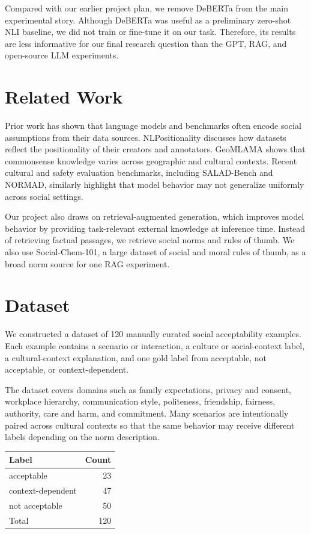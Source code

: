 \documentclass{article}
\begin{document}
Compared with our earlier project plan, we remove DeBERTa from the main experimental story. Although DeBERTa was useful as a preliminary zero-shot NLI baseline, we did not train or fine-tune it on our task. Therefore, its results are less informative for our final research question than the GPT, RAG, and open-source LLM experiments.

\section{Related Work}

Prior work has shown that language models and benchmarks often encode social assumptions from their data sources. NLPositionality discusses how datasets reflect the positionality of their creators and annotators. GeoMLAMA shows that commonsense knowledge varies across geographic and cultural contexts. Recent cultural and safety evaluation benchmarks, including SALAD-Bench and NORMAD, similarly highlight that model behavior may not generalize uniformly across social settings.

Our project also draws on retrieval-augmented generation, which improves model behavior by providing task-relevant external knowledge at inference time. Instead of retrieving factual passages, we retrieve social norms and rules of thumb. We also use Social-Chem-101, a large dataset of social and moral rules of thumb, as a broad norm source for one RAG experiment.

\section{Dataset}

We constructed a dataset of 120 manually curated social acceptability examples. Each example contains a scenario or interaction, a culture or social-context label, a cultural-context explanation, and one gold label from acceptable, not acceptable, or context-dependent.

The dataset covers domains such as family expectations, privacy and consent, workplace hierarchy, communication style, politeness, friendship, fairness, authority, care and harm, and commitment. Many scenarios are intentionally paired across cultural contexts so that the same behavior may receive different labels depending on the norm description.

\begin{center}
\begin{tabular}{l r}
\hline
Label & Count \\
\hline
acceptable & 23 \\
context-dependent & 47 \\
not acceptable & 50 \\
\hline
Total & 120 \\
\hline
\end{tabular}
\end{center}
\end{document}

